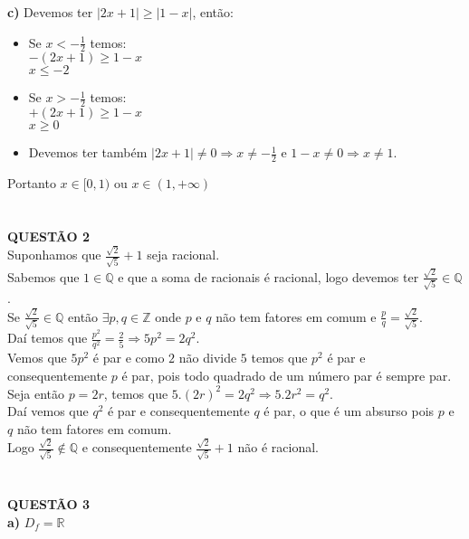 \documentclass[12pt]{article}
\begin{document}
{\bf c) } 
Devemos ter $|2x+1|\geq|1-x|$, então:
\begin{itemize}
\item Se $x<-\frac{1}{2}$ temos:\\
$-(2x+1)\geq1-x$\\
$x\leq-2$\\
\item Se $x>-\frac{1}{2}$ temos:\\
$+(2x+1)\geq1-x$\\
$x\geq0$\\
\item Devemos ter também $|2x+1|\neq0 \Rightarrow x\neq-\frac{1}{2}$ e $1-x\neq0 \Rightarrow x\neq 1$.\\
\end{itemize}
Portanto $x\in[0,1)$ ou $x\in(1,+\infty)$\\
\\
\\

{\bf QUESTÃO 2}\\
Suponhamos que $\frac{\sqrt{2}}{\sqrt{5}}+1$ seja racional.\\
Sabemos que $1\in\mathbb{Q}$ e que a soma de racionais é racional, logo devemos ter $\frac{\sqrt{2}}{\sqrt{5}}\in\mathbb{Q}$.\\
Se $\frac{\sqrt{2}}{\sqrt{5}}\in\mathbb{Q}$ então $\exists p,q\in\mathbb{Z}$ onde $p$ e $q$ não tem fatores em comum e $\frac{p}{q}=\frac{\sqrt{2}}{\sqrt{5}}$.\\
Daí temos que $\frac{p^2}{q^2}=\frac{2}{5}\Rightarrow5p^2=2q^2$.\\
Vemos que $5p^2$ é par e como $2$ não divide $5$ temos que $p^2$ é par e consequentemente $p$ é par, pois todo quadrado de um número par é sempre par.\\
Seja então $p=2r$, temos que $5.(2r)^2=2q^2\Rightarrow5.2r^2=q^2$.\\
Daí vemos que $q^2$ é par e consequentemente $q$ é par, o que é um absurso pois $p$ e $q$ não tem fatores em comum.\\
Logo $\frac{\sqrt{2}}{\sqrt{5}}\not\in\mathbb{Q}$ e consequentemente $\frac{\sqrt{2}}{\sqrt{5}}+1$ não é racional.\\
\\
\\

{\bf QUESTÃO 3}\\

{\bf a) } 
$D_f=\mathbb{R}$
\\
\end{document}
